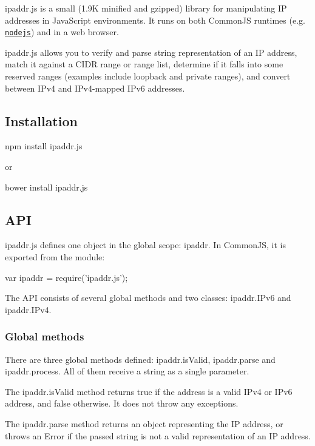 ipaddr.\+js is a small (1.\+9K minified and gzipped) library for manipulating IP addresses in Java\+Script environments. It runs on both Common\+JS runtimes (e.\+g. \href{http://nodejs.org}{\tt nodejs}) and in a web browser.

ipaddr.\+js allows you to verify and parse string representation of an IP address, match it against a C\+I\+DR range or range list, determine if it falls into some reserved ranges (examples include loopback and private ranges), and convert between I\+Pv4 and I\+Pv4-\/mapped I\+Pv6 addresses.

\subsection*{Installation}

{\ttfamily npm install ipaddr.\+js}

or

{\ttfamily bower install ipaddr.\+js}

\subsection*{A\+PI}

ipaddr.\+js defines one object in the global scope\+: {\ttfamily ipaddr}. In Common\+JS, it is exported from the module\+:


\begin{DoxyCode}
var ipaddr = require('ipaddr.js');
\end{DoxyCode}


The A\+PI consists of several global methods and two classes\+: ipaddr.\+I\+Pv6 and ipaddr.\+I\+Pv4.

\subsubsection*{Global methods}

There are three global methods defined\+: {\ttfamily ipaddr.\+is\+Valid}, {\ttfamily ipaddr.\+parse} and {\ttfamily ipaddr.\+process}. All of them receive a string as a single parameter.

The {\ttfamily ipaddr.\+is\+Valid} method returns {\ttfamily true} if the address is a valid I\+Pv4 or I\+Pv6 address, and {\ttfamily false} otherwise. It does not throw any exceptions.

The {\ttfamily ipaddr.\+parse} method returns an object representing the IP address, or throws an {\ttfamily Error} if the passed string is not a valid representation of an IP address.

